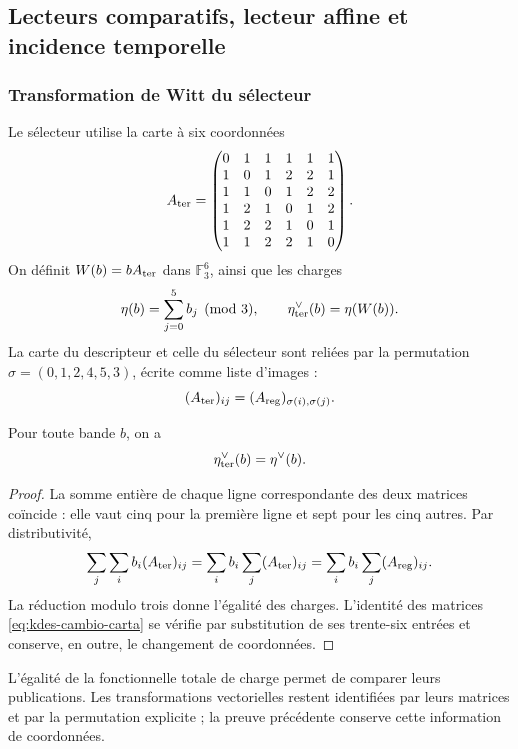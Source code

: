 \subsection{Lecteurs comparatifs, lecteur affine et incidence temporelle}

\subsubsection{Transformation de Witt du sélecteur}

Le sélecteur utilise la carte à six coordonnées
\[
 A_{\rm ter}=
 \begin{pmatrix}
 0&1&1&1&1&1\\
 1&0&1&2&2&1\\
 1&1&0&1&2&2\\
 1&2&1&0&1&2\\
 1&2&2&1&0&1\\
 1&1&2&2&1&0
 \end{pmatrix}.
\]
On définit $W(b)=bA_{\rm ter}$ dans $\mathbb F_3^6$, ainsi que les charges
\[
 \eta(b)=\sum_{j=0}^5 b_j\pmod3,
 \qquad\eta_{\rm ter}^\vee(b)=\eta(W(b)).
\]
La carte du descripteur et celle du sélecteur sont reliées par la
permutation $\sigma=(0,1,2,4,5,3)$, écrite comme liste d'images :
\begin{equation}
 (A_{\rm ter})_{ij}=(A_{\rm reg})_{\sigma(i),\sigma(j)}.
 \label{eq:kdes-cambio-carta}
\end{equation}

\begin{lemma}
Pour toute bande $b$, on a
\[
 \eta_{\rm ter}^\vee(b)=\eta^\vee(b).
\]
\end{lemma}
\begin{proof}
La somme entière de chaque ligne correspondante des deux matrices coïncide :
elle vaut cinq pour la première ligne et sept pour les cinq autres. Par
distributivité,
\[
 \sum_j\sum_i b_i(A_{\rm ter})_{ij}
 =\sum_i b_i\sum_j(A_{\rm ter})_{ij}
 =\sum_i b_i\sum_j(A_{\rm reg})_{ij}.
\]
La réduction modulo trois donne l'égalité des charges. L'identité des matrices \eqref{eq:kdes-cambio-carta} se vérifie par substitution de ses trente-six entrées et conserve, en outre, le changement de coordonnées.
\end{proof}

L'égalité de la fonctionnelle totale de charge permet de comparer leurs publications. Les transformations vectorielles restent identifiées par leurs matrices et par la permutation explicite ; la preuve précédente conserve cette information de coordonnées.


